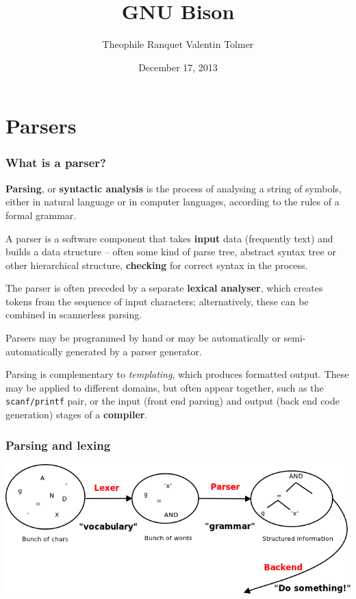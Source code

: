 \documentclass{beamer}
\begin{document}
\title{GNU Bison}
\author{Theophile Ranquet
Valentin Tolmer}

\date{December 17, 2013}

\begin{frame}[plain]
  \titlepage
\end{frame}

\section{Parsers}

\begin{frame}
  \frametitle{What is a parser?}
  \textbf{Parsing}, or \textbf{syntactic analysis} is the process of analysing
  a string of symbols, either in natural language or in computer languages,
  according to the rules of a formal grammar.

  \vfill

  A parser is a software component that takes \textbf{input} data (frequently
  text) and builds a data structure – often some kind of parse tree, abstract
  syntax tree or other hierarchical structure, \textbf{checking} for correct
  syntax in the process.

\end{frame}
\begin{frame}
  The parser is often preceded by a separate \textbf{lexical analyser}, which
  creates tokens from the sequence of input characters; alternatively, these
  can be combined in scannerless parsing.

  \vfill

  Parsers may be programmed by hand or may be automatically or
  semi-automatically generated by a parser generator.

  \vfill

  Parsing is complementary to \textit{templating}, which produces formatted output.
  These may be applied to different domains, but often appear together, such as
  the \texttt{scanf/printf} pair, or the input (front end parsing) and output
  (back end code generation) stages of a \textbf{compiler}.
\end{frame}

\begin{frame}
  \frametitle{Parsing and lexing}
  \begin{center}
    \includegraphics[scale=0.4]{lexer_parser}
  \end{center}
\end{frame}
\end{document}
